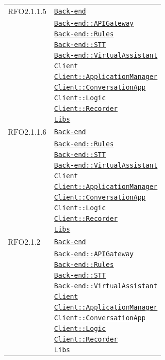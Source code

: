 \begin{longtable}{|>{\centering}m{3cm}|m{10cm}<{\centering}|}
RFO2.1.1.5 & \hyperref[Back-end]{\texttt{Back-end}}\\
& \hyperref[Back-end::APIGateway]{\texttt{Back-end::APIGateway}}\\
& \hyperref[Back-end::Rules]{\texttt{Back-end::Rules}}\\
& \hyperref[Back-end::STT]{\texttt{Back-end::STT}}\\
& \hyperref[Back-end::VirtualAssistant]{\texttt{Back-end::VirtualAssistant}}\\
& \hyperref[Client]{\texttt{Client}}\\
& \hyperref[Client::ApplicationManager]{\texttt{Client::ApplicationManager}}\\
& \hyperref[Client::ConversationApp]{\texttt{Client::ConversationApp}}\\
& \hyperref[Client::Logic]{\texttt{Client::Logic}}\\
& \hyperref[Client::Recorder]{\texttt{Client::Recorder}}\\
& \hyperref[Libs]{\texttt{Libs}}\\ \hline

RFO2.1.1.6 & \hyperref[Back-end]{\texttt{Back-end}}\\
& \hyperref[Back-end::Rules]{\texttt{Back-end::Rules}}\\
& \hyperref[Back-end::STT]{\texttt{Back-end::STT}}\\
& \hyperref[Back-end::VirtualAssistant]{\texttt{Back-end::VirtualAssistant}}\\
& \hyperref[Client]{\texttt{Client}}\\
& \hyperref[Client::ApplicationManager]{\texttt{Client::ApplicationManager}}\\
& \hyperref[Client::ConversationApp]{\texttt{Client::ConversationApp}}\\
& \hyperref[Client::Logic]{\texttt{Client::Logic}}\\
& \hyperref[Client::Recorder]{\texttt{Client::Recorder}}\\
& \hyperref[Libs]{\texttt{Libs}}\\ \hline

RFO2.1.2 & \hyperref[Back-end]{\texttt{Back-end}}\\
& \hyperref[Back-end::APIGateway]{\texttt{Back-end::APIGateway}}\\
& \hyperref[Back-end::Rules]{\texttt{Back-end::Rules}}\\
& \hyperref[Back-end::STT]{\texttt{Back-end::STT}}\\
& \hyperref[Back-end::VirtualAssistant]{\texttt{Back-end::VirtualAssistant}}\\
& \hyperref[Client]{\texttt{Client}}\\
& \hyperref[Client::ApplicationManager]{\texttt{Client::ApplicationManager}}\\
& \hyperref[Client::ConversationApp]{\texttt{Client::ConversationApp}}\\
& \hyperref[Client::Logic]{\texttt{Client::Logic}}\\
& \hyperref[Client::Recorder]{\texttt{Client::Recorder}}\\
& \hyperref[Libs]{\texttt{Libs}}\\ \hline


\end{longtable}
